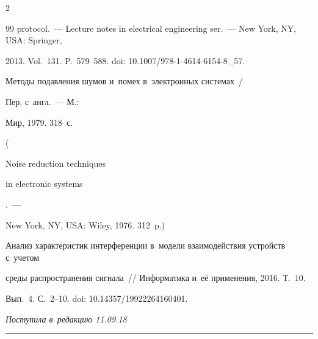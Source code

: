 \begin{multicols}{2}
{{\begin{thebibliography}{99}
protocol.~--- Lecture notes in electrical engineering ser.~--- New York, NY, USA: Springer, 

2013. Vol.~131. P.~579--588. doi: 10.1007/978-1-4614-6154-8\_57. 


 Методы подавления шумов и~помех в~электронных системах~/

Пер. с~англ.~--- М.: 

Мир, 1979. 318~с.

( {Noise reduction techniques 

in electronic systems}.~--- 

New York, NY, USA: Wiley, 1976. 312~p.)



Анализ характеристик интерференции в~модели взаимодействия устройств с~учетом 

среды распространения сигнала~// Информатика и~её применения, 2016. Т.~10. 

Вып.~4. С.~2--10. doi: 10.14357/19922264160401.



 \end{thebibliography}



 }

 }



\end{multicols}



\vspace*{-3pt}



\hfill{\small\textit{Поступила в~редакцию 11.09.18}}



\vspace*{8pt}












\hrule



\vspace*{2pt}



